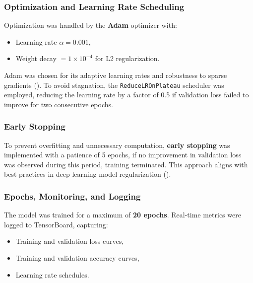 \documentclass[
  12pt,
  oneside]{article}
\providecommand{\tightlist}{%
  \setlength{\itemsep}{0pt}\setlength{\parskip}{0pt}}
\begin{document}
\subsubsection{Optimization and Learning Rate
Scheduling}\label{optimization-and-learning-rate-scheduling}

Optimization was handled by the \textbf{Adam} optimizer with:

\begin{itemize}
\tightlist
\item
  Learning rate \(\alpha = 0.001\),
\item
  Weight decay \(= 1\times 10^{-4}\) for L2 regularization.
\end{itemize}

Adam was chosen for its adaptive learning rates and robustness to sparse
gradients (). To avoid
stagnation, the \texttt{ReduceLROnPlateau} scheduler was employed,
reducing the learning rate by a factor of 0.5 if validation loss failed
to improve for two consecutive epochs.

\subsubsection{Early Stopping}\label{early-stopping}

To prevent overfitting and unnecessary computation, \textbf{early
stopping} was implemented with a patience of 5 epochs, if no improvement
in validation loss was observed during this period, training terminated.
This approach aligns with best practices in deep learning model
regularization ().

\subsubsection{Epochs, Monitoring, and
Logging}\label{epochs-monitoring-and-logging}

The model was trained for a maximum of \textbf{20 epochs}. Real-time
metrics were logged to TensorBoard, capturing:

\begin{itemize}
\tightlist
\item
  Training and validation loss curves,
\item
  Training and validation accuracy curves,
\item
  Learning rate schedules.
\end{itemize}
\end{document}
